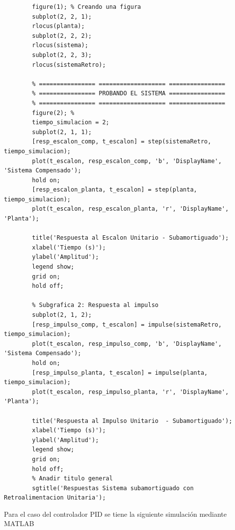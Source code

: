 \documentclass[conference]{IEEEtran}
\begin{document}
\begin{lstlisting}[numbers=none, caption={Controlador PD}]
		% Dibujando el LGR del sistema a lazo abierto
		figure(1); % Creando una figura
		subplot(2, 2, 1);
		rlocus(planta);
		subplot(2, 2, 2);
		rlocus(sistema);
		subplot(2, 2, 3);
		rlocus(sistemaRetro);
		
		% ================ =================== ================
		% ================ PROBANDO EL SISTEMA ================
		% ================ =================== ================
		figure(2); %
		tiempo_simulacion = 2;
		subplot(2, 1, 1);
		[resp_escalon_comp, t_escalon] = step(sistemaRetro, tiempo_simulacion);
		plot(t_escalon, resp_escalon_comp, 'b', 'DisplayName', 'Sistema Compensado');
		hold on;
		[resp_escalon_planta, t_escalon] = step(planta, tiempo_simulacion);
		plot(t_escalon, resp_escalon_planta, 'r', 'DisplayName', 'Planta');
		
		title('Respuesta al Escalon Unitario - Subamortiguado');
		xlabel('Tiempo (s)');
		ylabel('Amplitud');
		legend show;
		grid on; 
		hold off;
		
		% Subgrafica 2: Respuesta al impulso 
		subplot(2, 1, 2); 
		[resp_impulso_comp, t_escalon] = impulse(sistemaRetro, tiempo_simulacion);
		plot(t_escalon, resp_impulso_comp, 'b', 'DisplayName', 'Sistema Compensado');
		hold on;
		[resp_impulso_planta, t_escalon] = impulse(planta, tiempo_simulacion);
		plot(t_escalon, resp_impulso_planta, 'r', 'DisplayName', 'Planta');
		
		title('Respuesta al Impulso Unitario  - Subamortiguado');
		xlabel('Tiempo (s)');
		ylabel('Amplitud'); 
		legend show;
		grid on; 
		hold off;
		% Anadir titulo general 
		sgtitle('Respuestas Sistema subamortiguado con Retroalimentacion Unitaria');
	\end{lstlisting}
	
	Para el caso del controlador PID se tiene la siguiente simulación mediante MATLAB
	
\end{document}
